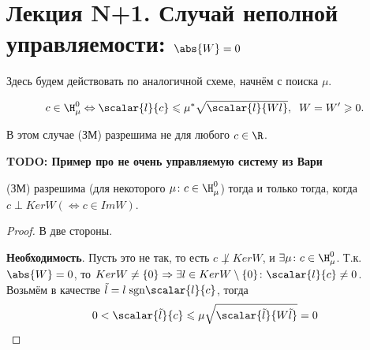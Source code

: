 \chapter{Лекция N+1. Случай неполной управляемости: $\abs{W} = 0$}

Здесь будем действовать по аналогичной схеме, начнём с поиска $\mu$.

$$
c \in \H_{\mu}^0 \Leftrightarrow \scalar{l}{c} \leqslant \mu^* \sqrt{\scalar{l}{Wl}}, \;\; W = W' \geqslant 0.
$$

В этом случае (ЗМ) разрешима не для любого $c \in \R$.

\textbf{TODO: Пример про не очень управляемую систему из Вари}

\begin{statement}
    (ЗМ) разрешима (для некоторого $\mu \colon c \in \H_{\mu}^0$) тогда и только тогда, когда $c \perp Ker W (\Leftrightarrow c \in Im W)$.
\end{statement}
\begin{proof}
    В две стороны.

    \textbf{Необходимость}. Пусть это не так, то есть $c \not\perp Ker W$, и $\exists \mu \colon c \in \H_{\mu}^0$. Т.к. $\abs{W} = 0$, то $Ker W \neq \{0\} \Rightarrow \exists l \in Ker W \setminus \{0\} \colon \scalar{l}{c} \neq 0$. Возьмём в качестве $\tilde{l} = l \; \mathrm{sgn} \scalar{l}{c}$, тогда
    $$
        0 < \scalar{\tilde{l}}{c} \leqslant \mu \sqrt{\scalar{\tilde{l}}{W\tilde{l}}} = 0
    $$

    
\end{proof}